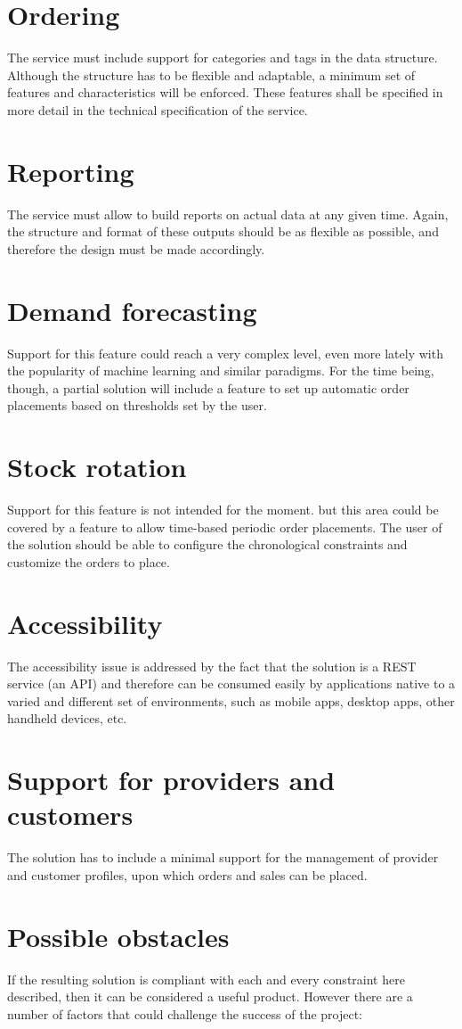 \section{Ordering}
The service must include support for categories and tags in the data structure. Although the structure has to be flexible and adaptable, a minimum set of features and characteristics will be enforced. These features shall be specified in more detail in the technical specification of the service.
\section{Reporting}
The service must allow to build reports on actual data at any given time. Again, the structure and format of these outputs should be as flexible as possible, and therefore the design must be made accordingly.
\section{Demand forecasting}
Support for this feature could reach a very complex level, even more lately with the popularity of machine learning and similar paradigms. For the time being, though, a partial solution will include a feature to set up automatic order placements based on thresholds set by the user.
\section{Stock rotation}
Support for this feature is not intended for the moment. but this area could be covered by a feature to allow time-based periodic order placements. The user of the solution should be able to configure the chronological constraints and customize the orders to place.
\section{Accessibility}
The accessibility issue is addressed by the fact that the solution is a REST service (an API) and therefore can be consumed easily by applications native to a varied and different set of environments, such as mobile apps, desktop apps, other handheld devices, etc.
\section{Support for providers and customers}
The solution has to include a minimal support for the management of provider and customer profiles, upon which orders and sales can be placed.
\section{Possible obstacles}
If the resulting solution is compliant with each and every constraint here described, then it can be considered a useful product. However there are a number of factors that could challenge the success of the project:


